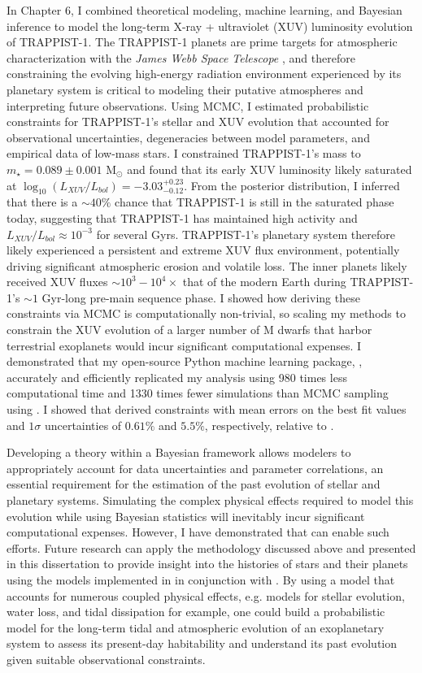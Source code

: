 In Chapter 6, I combined theoretical modeling, machine learning, and Bayesian inference to model the long-term X-ray + ultraviolet (XUV) luminosity evolution of TRAPPIST-1. The TRAPPIST-1 planets are prime targets for atmospheric characterization with the \textit{James Webb Space Telescope} \citep{Morley2017,Lincowski2018,Lustig2019}, and therefore constraining the evolving high-energy radiation environment experienced by its planetary system is critical to modeling their putative atmospheres and interpreting future observations. Using MCMC, I estimated probabilistic constraints for TRAPPIST-1's stellar and XUV evolution that accounted for observational uncertainties, degeneracies between model parameters, and empirical data of low-mass stars. I constrained TRAPPIST-1's mass to $m_{\star} = 0.089 \pm{0.001}$ M$_{\odot}$ and found that its early XUV luminosity likely saturated at $\log_{10}(L_{XUV}/L_{bol}) = -3.03^{+0.23}_{-0.12}$. From the posterior distribution, I inferred that there is a ${\sim}40\%$ chance that TRAPPIST-1 is still in the saturated phase today, suggesting that TRAPPIST-1 has maintained high activity and $L_{XUV}/L_{bol} \approx 10^{-3}$ for several Gyrs. TRAPPIST-1's planetary system therefore likely experienced a persistent and extreme XUV flux environment, potentially driving significant atmospheric erosion and volatile loss. The inner planets likely received XUV fluxes ${\sim}10^3 - 10^4\times$ that of the modern Earth during TRAPPIST-1's ${\sim}1$ Gyr-long pre-main sequence phase. I showed how deriving these constraints via MCMC is computationally non-trivial, so scaling my methods to constrain the XUV evolution of a larger number of M dwarfs that harbor terrestrial exoplanets would incur significant computational expenses. I demonstrated that my open-source Python machine learning package, \approxposterior, accurately and efficiently replicated my analysis using 980 times less computational time and 1330 times fewer simulations than MCMC sampling using \emcee. I showed that \approxposterior derived constraints with mean errors on the best fit values and $1\sigma$ uncertainties of $0.61\%$ and $5.5\%$, respectively, relative to \emcee.

Developing a theory within a Bayesian framework allows modelers to appropriately account for data uncertainties and parameter correlations, an essential requirement for the estimation of the past evolution of stellar and planetary systems. Simulating the complex physical effects required to model this evolution while using Bayesian statistics will inevitably incur significant computational expenses. However, I have demonstrated that \approxposterior can enable such efforts. Future research can apply the methodology discussed above and presented in this dissertation to provide insight into the histories of stars and their planets using the models implemented in \vplanet in conjunction with \approxposterior. By using a model that accounts for numerous coupled physical effects, e.g. models for stellar evolution, water loss, and tidal dissipation for example, one could build a probabilistic model for the long-term tidal and atmospheric evolution of an exoplanetary system to assess its present-day habitability and understand its past evolution given suitable observational constraints. 


